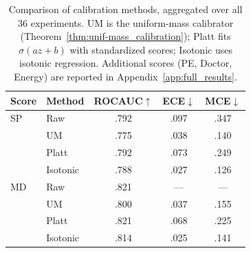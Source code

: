 \begin{table}[t]
\centering
\caption{Comparison of calibration methods, aggregated over all 36 experiments.
UM is the uniform-mass calibrator (Theorem~\ref{thm:unif-mass_calibration}); Platt fits $\sigma(a z + b)$ with standardized scores; Isotonic uses isotonic regression.
Additional scores (PE, Doctor, Energy) are reported in Appendix~\ref{app:full_results}.}
\label{tab:calibration_comparison}
\small
\begin{tabular}{@{}llccc@{}}
\toprule
\textbf{Score} & \textbf{Method} & \textbf{ROCAUC}$\uparrow$ & \textbf{ECE}$\downarrow$ & \textbf{MCE}$\downarrow$ \\
\midrule
SP & Raw & .792 & .097 & .347 \\
 & UM & .775 & .038 & .140 \\
 & Platt & .792 & .073 & .249 \\
 & Isotonic & .788 & .027 & .126 \\
\midrule
MD & Raw & .821 & --- & --- \\
 & UM & .800 & .037 & .155 \\
 & Platt & .821 & .068 & .225 \\
 & Isotonic & .814 & .025 & .141 \\
\bottomrule
\end{tabular}
\end{table}
